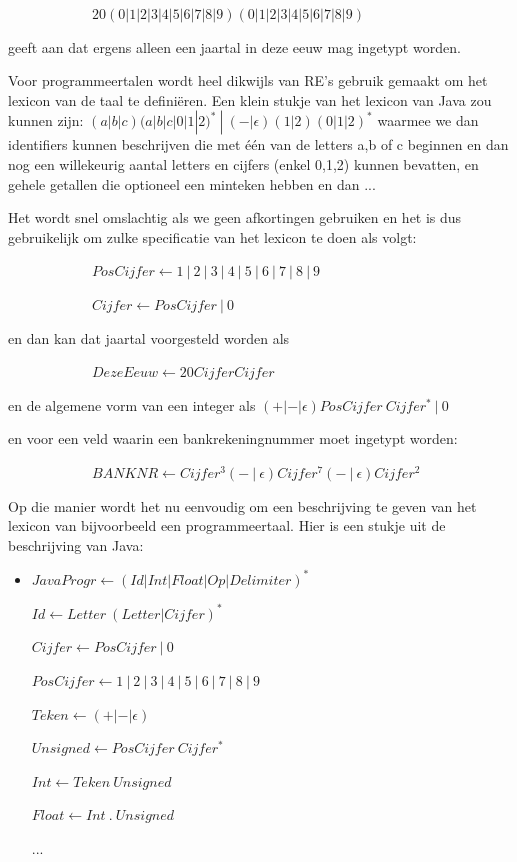 ~~~~~~~~~~~~$20(0|1|2|3|4|5|6|7|8|9)(0|1|2|3|4|5|6|7|8|9)$


geeft aan dat ergens alleen een jaartal in deze eeuw mag
ingetypt worden. 


Voor programmeertalen wordt heel dikwijls van RE's gebruik gemaakt om
het lexicon van de taal te defini\"eren. Een klein stukje van het
lexicon van Java zou kunnen zijn:
$(a|b|c)(a|b|c|0|1|2)^*~|~(-|\epsilon)(1|2)(0|1|2)^*$ waarmee we dan identifiers
kunnen beschrijven die met \'{e}\'{e}n van de letters a,b of c
beginnen en dan nog een willekeurig aantal letters en cijfers (enkel
0,1,2) kunnen bevatten, en gehele getallen die optioneel een minteken
hebben en dan ...


Het wordt snel omslachtig als we geen afkortingen gebruiken en het is
dus gebruikelijk om zulke specificatie van het lexicon te doen als volgt:


~~~~~~~~~~~~$PosCijfer \leftarrow 1~|~2~|~3~|~4~|~5~|~6~|~7~|~8~|~9$

~~~~~~~~~~~~$Cijfer \leftarrow PosCijfer~|~0$


en dan kan dat jaartal voorgesteld worden als 


~~~~~~~~~~~~$DezeEeuw \leftarrow 20CijferCijfer$


en de algemene vorm van een integer als $(+|-|\epsilon)PosCijfer~Cijfer^*~|~0$


en voor een veld waarin een bankrekeningnummer moet ingetypt worden:


~~~~~~~~~~~~$BANKNR \leftarrow Cijfer^3(-~|~\epsilon)Cijfer^7(-~|~\epsilon)Cijfer^2$


Op die manier wordt het nu eenvoudig om een beschrijving te geven van
het lexicon van bijvoorbeeld een programmeertaal. Hier is een stukje
uit de beschrijving van Java:


\begin{itemize}
\item[]
$JavaProgr \leftarrow (Id|Int|Float|Op|Delimiter)^*$

$Id \leftarrow Letter~(Letter|Cijfer)^*$

$Cijfer \leftarrow PosCijfer~|~0$

$PosCijfer \leftarrow 1~|~2~|~3~|~4~|~5~|~6~|~7~|~8~|~9$

$Teken \leftarrow (+|-|\epsilon)$

$Unsigned \leftarrow PosCijfer~Cijfer^*$

$Int \leftarrow Teken~Unsigned$

$Float \leftarrow Int~.~Unsigned$

...
\end{itemize}

